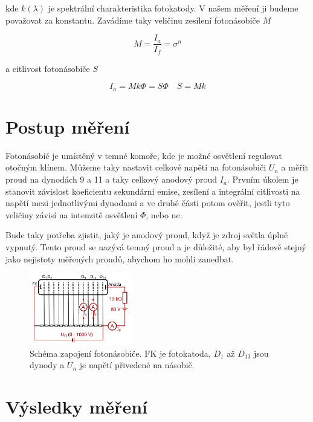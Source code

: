 \documentclass[a4paper,11pt]{article}
\begin{document}
\noindent
kde $ k(\lambda) $ je spektrální charakteristika fotokatody. V našem měření ji budeme považovat za konstantu. Zavádíme taky veličinu zesílení fotonásobiče $ M $ 

\begin{equation}
M = \frac{I_a}{I_f} = \sigma^{n}
\end{equation}

\noindent
a citlivost fotonásobiče $ S $ 

\begin{equation}
I_a = M k \Phi = S \Phi \quad S = M k
\end{equation}

 
\section{Postup měření}

Fotonásobič je umístěný v temné komoře, kde je možné osvětlení regulovat otočným klínem. Můžeme taky nastavit celkové napětí na fotonásobiči $ U_n $ a měřit proud na dynodách 9 a 11 a taky celkový anodový proud $ I_a $.
Prvním úkolem je stanovit závislost koeficientu sekundární emise, zesílení a integrální citlivosti na napětí mezi jednotlivými dynodami a ve druhé části potom ověřit, jestli tyto veličiny závisí na intenzitě osvětlení $ \Phi $, nebo ne.

Bude taky potřeba zjistit, jaký je anodový proud, když je zdroj světla úplně vypnutý. Tento proud se nazývá temný proud a je důležité, aby byl řádově stejný jako nejistoty měřených proudů, abychom ho mohli zanedbat.

\begin{figure}[htpb]
    \centering
    \includegraphics[width=0.4\textwidth]{fotonasobic.png}
    \caption{Schéma zapojení fotonásobiče. FK je fotokatoda, $ D_1 $ až $ D_{13} $ jsou dynody a $ U_n $ je napětí přivedené na násobič. }
\end{figure}

\section{Výsledky měření}
\end{document}
